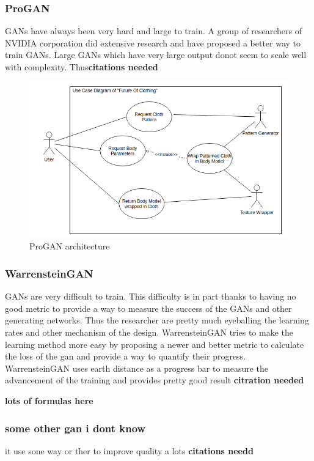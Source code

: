 \documentclass{article}
\begin{document}
\subsubsection{ProGAN}
GANs have always been very hard and large to train. A group of researchers of NVIDIA corporation did extensive research and have proposed a better way to train GANs. Large GANs which have very large output donot seem to scale well with complexity. Thus\textbf{citations needed}
\begin{figure}[h]
    \includegraphics[scale=0.5]{images/softwareDiagrams/FinalSystemUseCase.png}
    \centering
    \caption{ProGAN architecture}    
\end{figure}

\subsubsection{WarrensteinGAN}
GANs are very difficult to train. This difficulty is in part thanks to having no good metric to provide a way to measure the success of the GANs and other generating networks. Thus the researcher are pretty much eyeballing the learning rates and other mechanism of the design. WarrensteinGAN tries to make the learning method more easy by proposing a newer and better metric to calculate the loss of the gan and provide a way to quantify their progress. WarrensteinGAN uses earth distance as a progress bar to measure the advancement of the training and provides pretty good result \textbf{citration needed}
\break

\textbf{lots of formulas here}

\subsubsection{some other gan i dont know}
it use sone way or ther to improve quality a lots \textbf{citations needd}
\end{document}
